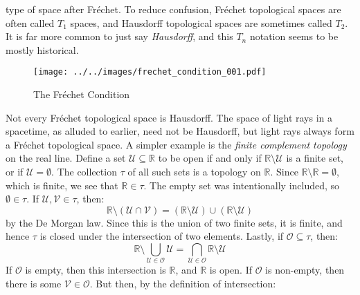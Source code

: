 \documentclass{article}
\theoremstyle{plain}
\theoremstyle{normal}
\newenvironment{example}{%
    \pushQED{\qed}\renewcommand{\qedsymbol}{$\blacksquare$}\examplex%
}{%
    \popQED\endexamplex%
}
\begin{document}
    type of space after Fr\'{e}chet. To reduce confusion,
    Fr\'{e}chet topological spaces are often called $T_{1}$ spaces, and
    Hausdorff topological spaces are sometimes called $T_{2}$. It is far
    more common to just say \textit{Hausdorff}, and this $T_{n}$ notation seems
    to be mostly historical.
    \begin{figure}
        \centering
        \texttt{[image: ../../images/frechet\_condition\_001.pdf]}
        \caption{The Fr\'{e}chet Condition}
        \label{fig:frechet_condition_001}
    \end{figure}
    \begin{example}[\textbf{Finite Complement Topology}]
        Not every Fr\'{e}chet topological space is Hausdorff. The space of
        light rays in a spacetime, as alluded to earlier, need not be
        Hausdorff, but light rays always form a Fr\'{e}chet topological
        space. A simpler example is the \textit{finite complement topology}
        on the real line. Define a set $\mathcal{U}\subseteq\mathbb{R}$ to be
        open if and only if $\mathbb{R}\setminus\mathcal{U}$ is a finite set,
        or if $\mathcal{U}=\emptyset$.
        The collection $\tau$ of all such sets is a topology on $\mathbb{R}$.
        Since $\mathbb{R}\setminus\mathbb{R}=\emptyset$, which is finite,
        we see that $\mathbb{R}\in\tau$. The empty set was intentionally
        included, so $\emptyset\in\tau$. If $\mathcal{U},\mathcal{V}\in\tau$,
        then:
        \begin{equation}
            \mathbb{R}\setminus(\mathcal{U}\cap\mathcal{V})=
                (\mathbb{R}\setminus\mathcal{U})\cup
                (\mathbb{R}\setminus\mathcal{U})
        \end{equation}
        by the De Morgan law. Since this is the union of two finite sets, it
        is finite, and hence $\tau$ is closed under the intersection of two
        elements. Lastly, if $\mathcal{O}\subseteq\tau$, then:
        \begin{equation}
            \mathbb{R}\setminus\bigcup_{\mathcal{U}\in\mathcal{O}}\mathcal{U}
            =\bigcap_{\mathcal{U}\in\mathcal{O}}\mathbb{R}\setminus\mathcal{U}
        \end{equation}
        If $\mathcal{O}$ is empty, then this intersection is $\mathbb{R}$,
        and $\mathbb{R}$ is open. If $\mathcal{O}$ is non-empty, then there is
        some $\mathcal{V}\in\mathcal{O}$. But then, by the definition of
        intersection:
        \begin{equation}

\end{equation}
\end{example}
\end{document}
